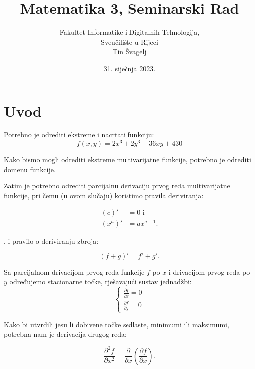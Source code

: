 \documentclass[12pt,a4paper]{report}
\title{Matematika 3, Seminarski Rad}
\author{
Fakultet Informatike i Digitalnih Tehnologija,\\
Sveučilište u Rijeci\\
Tin Švagelj\\
}
\date{31. siječnja 2023.}
\begin{document}



\maketitle

% 

\tableofcontents
\newpage

\setcounter{page}{1}

\chapter{Uvod}

Potrebno je odrediti ekstreme i nacrtati funkciju:
\begin{equation}
f(x, y) = 2x^3 + 2y^3 - 36xy + 430
\end{equation}

Kako bismo mogli odrediti ekstreme multivarijatne funkcije, potrebno je odrediti domenu funkcije.

Zatim je potrebno odrediti parcijalnu derivaciju prvog reda multivarijatne funkcije,
pri čemu (u ovom slučaju) koristimo pravila deriviranja:

\begin{align}
    (c)' &= 0 \text{ i }\\
    (x^a)' &= ax^{a-1}.
\end{align}

, i pravilo o deriviranju zbroja:

\begin{equation}
    (f + g)' = f' + g'.
\end{equation}

Sa parcijalnom drivacijom prvog reda funkcije $f$ po $x$ i drivacijom prvog reda po $y$ određujemo stacionarne točke, rješavajući sustav jednadžbi:
\begin{equation}
    \begin{cases}
        \frac{\partial f}{\partial x} = 0 \\
        \frac{\partial f}{\partial y} = 0
    \end{cases}
\end{equation}

Kako bi utvrdili jesu li dobivene točke sedlaste, minimumi ili maksimumi, potrebna nam je derivacija drugog reda:

\begin{equation}
    \frac{\partial^2 f}{\partial x^2} = \frac{\partial}{\partial x} (\frac{\partial f}{\partial x}).
\end{equation}
\end{document}
